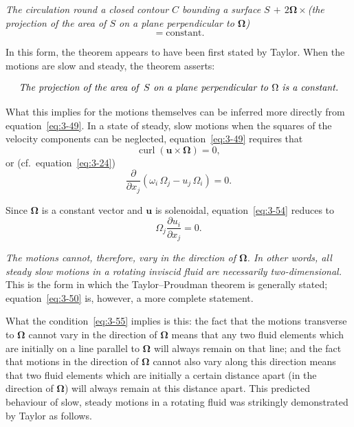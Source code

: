 \emph{The circulation round a closed contour $C$ bounding a surface $S$ $+$ $2\boldsymbol{\Omega}\times$(the projection of the area of $S$ on a plane perpendicular to $\boldsymbol{\Omega}$)}
\begin{equation}\label{eq:3-51}
= \text{constant}.
\end{equation}

In this form, the theorem appears to have been first stated by Taylor. When the motions are slow and steady, the theorem asserts:

\begin{equation}\label{eq:3-52}
\textit{The projection of the area of\/ $S$ on a plane perpendicular to\/ $\boldsymbol{\Omega}$ is a constant.}
\end{equation}

What this implies for the motions themselves can be inferred more directly from equation~\eqref{eq:3-49}. In a state of steady, slow motions when the squares of the velocity components can be neglected, equation~\eqref{eq:3-49} requires that
\begin{equation}\label{eq:3-53}
\operatorname{curl}(\mathbf{u}\times\boldsymbol{\Omega}) = 0,
\end{equation}
or (cf.\ equation~\eqref{eq:3-24})
\begin{equation}\label{eq:3-54}
\frac{\partial}{\partial x_j}(\omega_i\,\Omega_j - u_j\,\Omega_i) = 0.
\end{equation}

Since $\boldsymbol{\Omega}$ is a constant vector and $\mathbf{u}$ is solenoidal, equation~\eqref{eq:3-54} reduces to
\begin{equation}\label{eq:3-55}
\Omega_j\frac{\partial u_i}{\partial x_j} = 0.
\end{equation}

\emph{The motions cannot, therefore, vary in the direction of\/ $\boldsymbol{\Omega}$. In other words, all steady slow motions in a rotating inviscid fluid are necessarily two-dimensional.} This is the form in which the Taylor--Proudman theorem is generally stated; equation~\eqref{eq:3-50} is, however, a more complete statement.

What the condition~\eqref{eq:3-55} implies is this: the fact that the motions transverse to $\boldsymbol{\Omega}$ cannot vary in the direction of $\boldsymbol{\Omega}$ means that any two fluid elements which are initially on a line parallel to $\boldsymbol{\Omega}$ will always remain on that line; and the fact that motions in the direction of $\boldsymbol{\Omega}$ cannot also vary along this direction means that two fluid elements which are initially a certain distance apart (in the direction of $\boldsymbol{\Omega}$) will always remain at this distance apart. This predicted behaviour of slow, steady motions in a rotating fluid was strikingly demonstrated by Taylor as follows.

